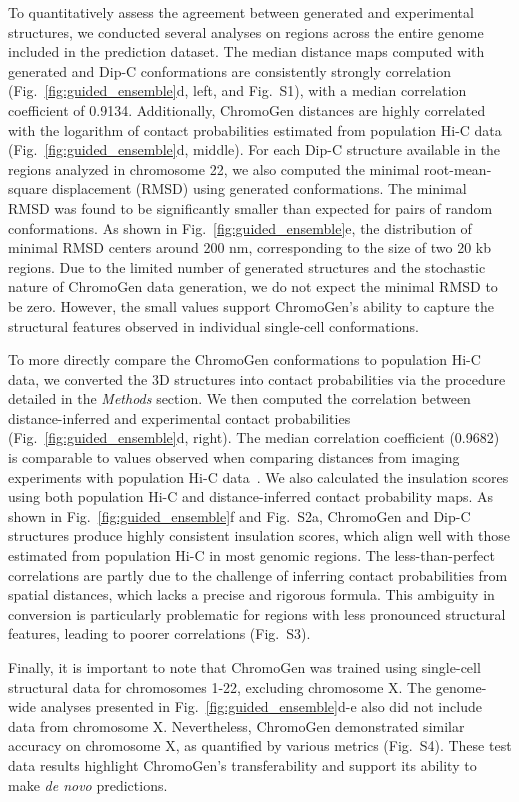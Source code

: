 \documentclass[12pt,letterpaper]{article}
\begin{document}
To quantitatively assess the agreement between generated and experimental structures, we conducted several analyses on regions across the entire genome included in the prediction dataset. The median distance maps computed with generated and Dip-C conformations are consistently strongly correlation  (Fig.~\ref{fig:guided_ensemble}d, left, and Fig.~S1), with a median correlation coefficient of 0.9134. 
Additionally, ChromoGen distances are highly correlated with the logarithm of contact probabilities estimated from population Hi-C data (Fig.~\ref{fig:guided_ensemble}d, middle). For each Dip-C structure available in the regions analyzed in chromosome 22, we also computed the minimal root-mean-square displacement (RMSD) using generated conformations. The minimal RMSD was found to be significantly smaller than expected for pairs of random conformations. As shown in Fig.~\ref{fig:guided_ensemble}e, the distribution of minimal RMSD centers around 200 nm, corresponding to the size of two 20 kb regions. Due to the limited number of generated structures and the stochastic nature of ChromoGen data generation, we do not expect the minimal RMSD to be zero. However, the small values support ChromoGen's ability to capture the structural features observed in individual single-cell conformations.

To more directly compare the ChromoGen conformations to population Hi-C data, we converted the 3D structures into contact probabilities via the procedure detailed in the \emph{Methods} section.
We then computed the correlation between distance-inferred and experimental contact probabilities (Fig.~\ref{fig:guided_ensemble}d, right). The median correlation coefficient (0.9682) is comparable to values observed when comparing distances from imaging experiments with population Hi-C data~\cite{Bintu2018}. We also calculated the insulation scores using both population Hi-C and distance-inferred contact probability maps. As shown in Fig.~\ref{fig:guided_ensemble}f and Fig.~S2a, ChromoGen and Dip-C structures produce highly consistent insulation scores, which align well with those estimated from population Hi-C in most genomic regions. 
The less-than-perfect correlations are partly due to the challenge of inferring contact probabilities from spatial distances, which lacks a precise and rigorous formula. This ambiguity in conversion is particularly problematic for regions with less pronounced structural features, leading to poorer correlations (Fig.~S3).



Finally, it is important to note that ChromoGen was trained using single-cell structural data for chromosomes 1-22, excluding chromosome X. The genome-wide analyses presented in Fig.~\ref{fig:guided_ensemble}d-e also did not include data from chromosome X. Nevertheless, ChromoGen demonstrated similar accuracy on chromosome X, as quantified by various metrics (Fig.~S4). 
These test data results highlight ChromoGen's transferability and support its ability to make \emph{de novo} predictions.  
\end{document}
